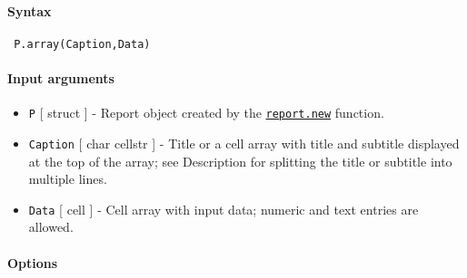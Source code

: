 


	\paragraph{Syntax}
 
 \begin{verbatim}
 P.array(Caption,Data)
 \end{verbatim}
 
 \paragraph{Input arguments}
 
 \begin{itemize}
 \item
   \texttt{P} {[} struct {]} - Report object created by the
   \href{report/new}{\texttt{report.new}} function.
 \item
   \texttt{Caption} {[} char \textbar{} cellstr {]} - Title or a cell
   array with title and subtitle displayed at the top of the array; see
   Description for splitting the title or subtitle into multiple lines.
 \item
   \texttt{Data} {[} cell {]} - Cell array with input data; numeric and
   text entries are allowed.
 \end{itemize}
 
 \paragraph{Options}
 
